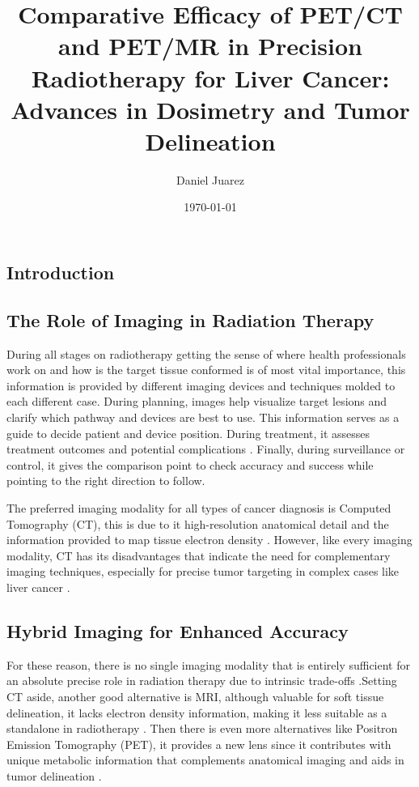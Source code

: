 \documentclass[11pt]{article} %
\title{Comparative Efficacy of PET/CT and PET/MR in Precision Radiotherapy for Liver Cancer: Advances in Dosimetry and Tumor Delineation}
\author{Daniel Juarez}
\date{\today}
\begin{document}
\maketitle

\begin{multicols}{2}

\section{Introduction}

\subsection{The Role of Imaging in Radiation Therapy}

During all stages on radiotherapy getting the sense of where health professionals  work on and how is the target tissue conformed is of most vital importance, this information is provided by different imaging devices and techniques molded to each different case. During planning, images help visualize target lesions and clarify which pathway and devices are best to use. This information serves as a guide to decide patient and device position. During treatment, it assesses treatment outcomes and potential complications \cite{decazes2021}. Finally, during surveillance or control, it gives the comparison point to check accuracy and success while pointing to the right direction to follow.

The preferred imaging modality for all types of cancer diagnosis is Computed Tomography (CT), this is due to it high-resolution anatomical detail and the information provided to map tissue electron density \cite{yan2024, decazes2021}. However, like every imaging modality, CT has its disadvantages that indicate the need for complementary imaging techniques, especially for precise tumor targeting in complex cases like liver cancer \cite{yan2024}.

\subsection{Hybrid Imaging for Enhanced Accuracy}
For these reason, there is no single imaging modality that is entirely sufficient for an absolute precise role in radiation therapy due to intrinsic trade-offs \cite{decazes2021}.Setting CT aside, another good alternative is MRI, although valuable for soft tissue delineation, it lacks electron density information, making it less suitable as a standalone in radiotherapy \cite{decazes2021}. Then there is even more alternatives like Positron Emission Tomography (PET), it provides a new lens since it contributes with unique metabolic information that complements anatomical imaging and aids in tumor delineation \cite{decazes2021}.


\end{multicols}
\end{document}
